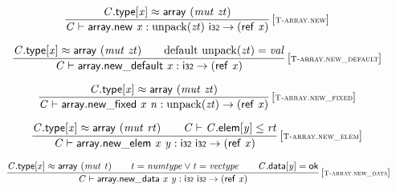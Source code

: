 \vspace{1ex}

$$
\begin{array}{@{}c@{}}\displaystyle
\frac{
{\mathit{C}}.\mathsf{type}{}[{\mathit{x}}] \approx \mathsf{array}~({\mathit{mut}}~{\mathit{zt}})
}{
{\mathit{C}} \vdash \mathsf{array.new}~{\mathit{x}} : {\mathrm{unpack}}({\mathit{zt}})~\mathsf{i{\scriptstyle32}} \rightarrow (\mathsf{ref}~{\mathit{x}})
} \, {[\textsc{\scriptsize T{-}array.new}]}
\qquad
\end{array}
$$

$$
\begin{array}{@{}c@{}}\displaystyle
\frac{
{\mathit{C}}.\mathsf{type}{}[{\mathit{x}}] \approx \mathsf{array}~({\mathit{mut}}~{\mathit{zt}})
 \qquad
{\mathrm{default}}~{\mathrm{unpack}}({\mathit{zt}}) = {\mathit{val}}
}{
{\mathit{C}} \vdash \mathsf{array.new\_default}~{\mathit{x}} : \mathsf{i{\scriptstyle32}} \rightarrow (\mathsf{ref}~{\mathit{x}})
} \, {[\textsc{\scriptsize T{-}array.new\_default}]}
\qquad
\end{array}
$$

$$
\begin{array}{@{}c@{}}\displaystyle
\frac{
{\mathit{C}}.\mathsf{type}{}[{\mathit{x}}] \approx \mathsf{array}~({\mathit{mut}}~{\mathit{zt}})
}{
{\mathit{C}} \vdash \mathsf{array.new\_fixed}~{\mathit{x}}~{\mathit{n}} : {\mathrm{unpack}}({\mathit{zt}}) \rightarrow (\mathsf{ref}~{\mathit{x}})
} \, {[\textsc{\scriptsize T{-}array.new\_fixed}]}
\qquad
\end{array}
$$

$$
\begin{array}{@{}c@{}}\displaystyle
\frac{
{\mathit{C}}.\mathsf{type}{}[{\mathit{x}}] \approx \mathsf{array}~({\mathit{mut}}~{\mathit{rt}})
 \qquad
{\mathit{C}} \vdash {\mathit{C}}.\mathsf{elem}{}[{\mathit{y}}] \leq {\mathit{rt}}
}{
{\mathit{C}} \vdash \mathsf{array.new\_elem}~{\mathit{x}}~{\mathit{y}} : \mathsf{i{\scriptstyle32}}~\mathsf{i{\scriptstyle32}} \rightarrow (\mathsf{ref}~{\mathit{x}})
} \, {[\textsc{\scriptsize T{-}array.new\_elem}]}
\qquad
\end{array}
$$

$$
\begin{array}{@{}c@{}}\displaystyle
\frac{
{\mathit{C}}.\mathsf{type}{}[{\mathit{x}}] \approx \mathsf{array}~({\mathit{mut}}~{\mathit{t}})
 \qquad
{\mathit{t}} = {\mathit{numtype}} \lor {\mathit{t}} = {\mathit{vectype}}
 \qquad
{\mathit{C}}.\mathsf{data}{}[{\mathit{y}}] = \mathsf{ok}
}{
{\mathit{C}} \vdash \mathsf{array.new\_data}~{\mathit{x}}~{\mathit{y}} : \mathsf{i{\scriptstyle32}}~\mathsf{i{\scriptstyle32}} \rightarrow (\mathsf{ref}~{\mathit{x}})
} \, {[\textsc{\scriptsize T{-}array.new\_data}]}
\qquad
\end{array}
$$

